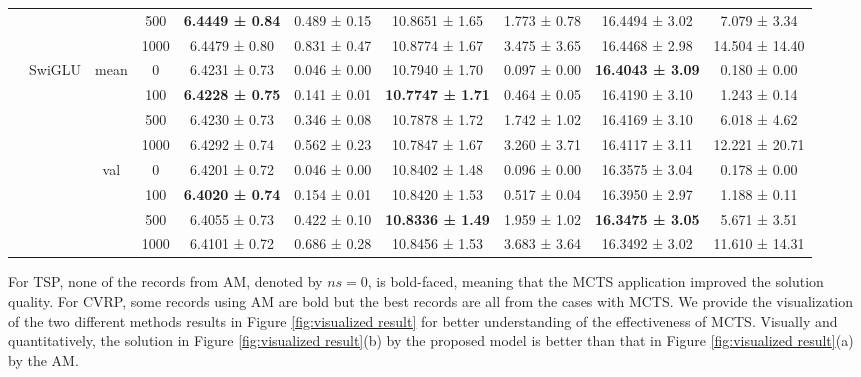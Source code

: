 \documentclass{article}
\begin{document}
\begin{table}[htbp]
{\begin{tabular}{c|c|c|c|c|c|c|c|c|c}
           &        &        & 500    & \textbf{6.4449 ± 0.84} & 0.489 ± 0.15 & 10.8651 ± 1.65 & 1.773 ± 0.78 & 16.4494 ± 3.02 & 7.079 ± 3.34 \\
           &        &        & 1000   & 6.4479 ± 0.80 & 0.831 ± 0.47 & 10.8774 ± 1.67 & 3.475 ± 3.65 & 16.4468 ± 2.98 & 14.504 ± 14.40 \\
    \cmidrule{2-10}       & \multicolumn{1}{c|}{\multirow{8}[4]{*}{SwiGLU}} & \multicolumn{1}{c|}{\multirow{4}[2]{*}{mean}} & 0      & 6.4231 ± 0.73 & 0.046 ± 0.00 & 10.7940 ± 1.70 & 0.097 ± 0.00 & \textbf{16.4043 ± 3.09} & 0.180 ± 0.00 \\
           &        &        & 100    & \textbf{6.4228 ± 0.75} & 0.141 ± 0.01 & \textbf{10.7747 ± 1.71} & 0.464 ± 0.05 & 16.4190 ± 3.10 & 1.243 ± 0.14 \\
           &        &        & 500    & 6.4230 ± 0.73 & 0.346 ± 0.08 & 10.7878 ± 1.72 & 1.742 ± 1.02 & 16.4169 ± 3.10 & 6.018 ± 4.62 \\
           &        &        & 1000   & 6.4292 ± 0.74 & 0.562 ± 0.23 & 10.7847 ± 1.67 & 3.260 ± 3.71 & 16.4117 ± 3.11 & 12.221 ± 20.71 \\
    \cmidrule{3-10}       &        & \multicolumn{1}{c|}{\multirow{4}[2]{*}{val}} & 0      & 6.4201 ± 0.72 & 0.046 ± 0.00 & 10.8402 ± 1.48 & 0.096 ± 0.00 & 16.3575 ± 3.04 & 0.178 ± 0.00 \\
           &        &        & 100    & \textbf{6.4020 ± 0.74} & 0.154 ± 0.01 & 10.8420 ± 1.53 & 0.517 ± 0.04 & 16.3950 ± 2.97 & 1.188 ± 0.11 \\
           &        &        & 500    & 6.4055 ± 0.73 & 0.422 ± 0.10 & \textbf{10.8336 ± 1.49} & 1.959 ± 1.02 & \textbf{16.3475 ± 3.05} & 5.671 ± 3.51 \\
           &        &        & 1000   & 6.4101 ± 0.72 & 0.686 ± 0.28 & 10.8456 ± 1.53 & 3.683 ± 3.64 & 16.3492 ± 3.02 & 11.610 ± 14.31 \\
    \bottomrule
    \end{tabular}%
    }
  \label{tab:CVRP result}%
\end{table}%

For TSP, none of the records from AM, denoted by $ns=0$, is bold-faced, meaning that the MCTS application improved the solution quality. For CVRP, some records using AM are bold but the best records are all from the cases with MCTS.
We provide the visualization of the two different methods results in Figure \ref{fig:visualized result} for better understanding of the effectiveness of MCTS. Visually and quantitatively, the solution in Figure \ref{fig:visualized result}(b) by the proposed model is better than that in Figure \ref{fig:visualized result}(a) by the AM.
\end{document}
